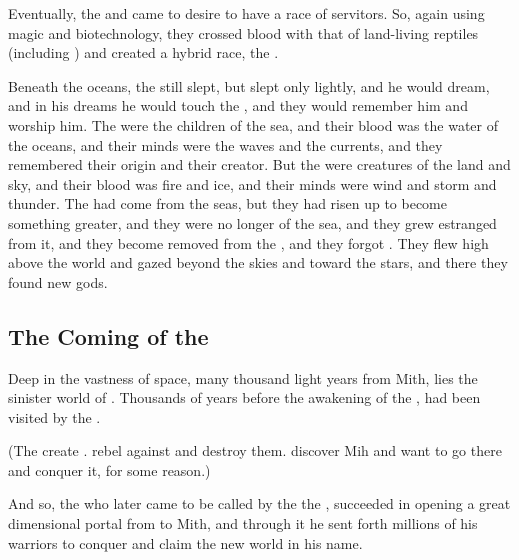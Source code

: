 
\label{Origin of Scathae}
Eventually, the \dragons{} and \nagae{} came to desire to have a race of servitors. So, again using magic and biotechnology, they crossed \naga{} blood with that of land-living reptiles (including \nycans{}) and created a hybrid race, the \scathae{}. 

Beneath the oceans, the \krakens{} still slept, but \Moroch{} slept only lightly, and he would dream, and in his dreams he would touch the \nagae{}, and they would remember him and worship him. The \nagae{} were the children of the sea, and their blood was the water of the oceans, and their minds were the waves and the currents, and they remembered their origin and their creator. But the \dragons{} were creatures of the land and sky, and their blood was fire and ice, and their minds were wind and storm and thunder. The \dragons{} had come from the seas, but they had risen up to become something greater, and they were no longer of the sea, and they grew estranged from it, and they become removed from the \nagae{}, and they forgot \Moroch{}. They flew high above the world and gazed beyond the skies and toward the stars, and there they found new gods. 


\subsection{The Coming of the \Banes{}}
Deep in the vastness of space, many thousand light years from Mith, lies the sinister world of \Erebos{}. Thousands of years before the awakening of the \dragons{}, \Erebos{} had been visited by the \voyagers{}. 

(The \voyagers{} create \banes{}. \Banes{} rebel against \voyagers{} and destroy them. \Banes{} discover Mih and want to go there and conquer it, for some reason.) 

And so, the \baneking{} who later came to be called by the \dragons{} the \Voidbringer, succeeded in opening a great dimensional portal from \Erebos{} to Mith, and through it he sent forth millions of his \bane{} warriors to conquer and claim the new world in his name. 

